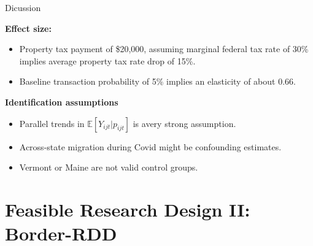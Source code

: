 \documentclass[10pt, aspectratio=169]{beamer}
\begin{document}
\begin{frame}{Dicussion}
    \begin{block}{\textbf{Effect size:}}
        \begin{itemize}
            \item Property tax payment of \$20,000, assuming marginal federal tax rate of 30\% implies average property tax rate drop of 15\%.
            \item Baseline transaction probability of 5\% implies an elasticity of about 0.66.
        \end{itemize}
    \end{block}

    \begin{block}{\alert{\textbf{Identification assumptions}}}
        \begin{itemize}
            \item Parallel trends in $\mathbb{E}\left[ Y_{ijt} | p_{ijt}\right]$ is avery strong assumption.
            \item Across-state migration during Covid might be confounding estimates.
            \item Vermont or Maine are not valid control groups.
        \end{itemize}
    \end{block}
     
\end{frame}

\section{Feasible Research Design II: Border-RDD}
\end{document}
